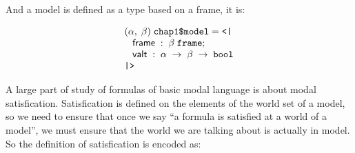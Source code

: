 \documentclass[letterpaper]{article}
\newenvironment{holmath}{\begin{displaymath}\begin{array}{l}}{\end{array}\end{displaymath}\ignorespacesafterend}
\begin{document}
And a model is defined as a type based on a frame, it is:

\begin{holmath}
  (\ensuremath{\alpha},\;\ensuremath{\beta})\;\HOLTyOp{chap1\$model} = \HOLTokenLeftrec{}\\
\;\;\;\HOLFieldName{frame}\;:\;\ensuremath{\beta}\;\HOLTyOp{frame};\\
\;\;\;\HOLFieldName{valt}\;:\;\ensuremath{\alpha}\;\ensuremath{\rightarrow}\;\ensuremath{\beta}\;\ensuremath{\rightarrow}\;\HOLTyOp{bool}\\
\HOLTokenRightrec{}
\end{holmath}

A large part of study of formulas of basic modal language is about modal satisfication. Satisfication is defined on the elements of the world set of a model, so we need to ensure that once we say ``a formula is satisfied at a world of a model'', we must ensure that the world we are talking about is actually in model. So the definition of satisfication is encoded as:
\end{document}
